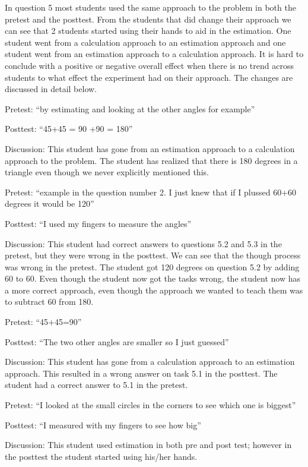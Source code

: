 \bigskip\noindent
In question 5 most students used the same approach to the problem in both the pretest and the posttest. From the students that did change their approach we can see that 2 students started using their hands to aid in the estimation. One student went from a calculation approach to an estimation approach and one student went from an estimation approach to a calculation approach. It is hard to conclude with a positive or negative overall effect when there is no trend across students to what effect the experiment had on their approach. The changes are discussed in detail below.

\bigskip\noindent
Pretest: ``by estimating and looking at the other angles for example''
\par\noindent Posttest: ``45+45 = 90  +90 = 180''
\par\noindent Discussion: This student has gone from an estimation approach to a calculation approach to the problem. The student has realized that there is 180 degrees in a triangle even though we never explicitly mentioned this.

\bigskip\noindent
Pretest: ``example in the question number 2. I just knew that if I plussed 60+60 degrees it would be 120''
\par\noindent Posttest: ``I used my fingers to measure the angles''
\par\noindent Discussion: This student had correct answers to questions 5.2 and 5.3 in the pretest, but they were wrong in the posttest. We can see that the though process was wrong in the pretest. The student got 120 degrees on question 5.2 by adding 60 to 60. Even though the student now got the tasks wrong, the student now has a more correct approach, even though the approach we wanted to teach them was to subtract 60 from 180.

\bigskip\noindent
Pretest: ``45+45=90''
\par\noindent Posttest: ``The two other angles are smaller so I just guessed''
\par\noindent Discussion: This student has gone from a calculation approach to an estimation approach. This resulted in a wrong answer on task 5.1 in the posttest. The student had a correct answer to 5.1 in the pretest.

\bigskip\noindent
Pretest: ``I looked at the small circles in the corners to see which one is biggest''
\par\noindent Posttest: ``I measured with my fingers to see how big''
\par\noindent Discussion: This student used estimation in both pre and post test; however in the posttest the student started using his/her hands. 


